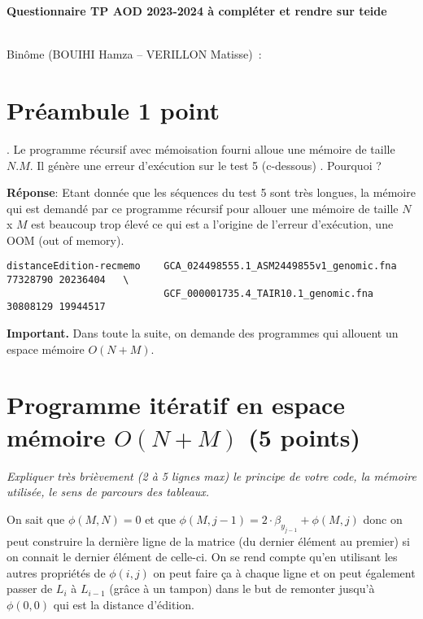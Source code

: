 \documentclass[10pt,a4paper]{article}
\begin{document}
\thispagestyle{empty}

\noindent\centerline{\bf\large Questionnaire  TP AOD 2023-2024 à compléter et rendre sur teide  } \\
Binôme 
(BOUIHI Hamza --
 VERILLON Matisse)
\,: \dotfill

\section{Préambule 1 point}.
Le programme récursif avec mémoisation fourni alloue une mémoire de taille $N.M$.
Il génère une erreur d'exécution sur le test 5 (c-dessous) . Pourquoi ? 

\vspace{0.2cm}
\textbf{Réponse}:  Etant donnée que les séquences du test 5 sont très longues, la mémoire qui est demandé par ce programme récursif pour allouer une mémoire de taille $N$ x $M$ est beaucoup trop élevé ce qui est a l'origine de l'erreur d'exécution, une OOM (out of memory).
\begin{verbatim}
distanceEdition-recmemo    GCA_024498555.1_ASM2449855v1_genomic.fna 77328790 20236404   \
                           GCF_000001735.4_TAIR10.1_genomic.fna 30808129 19944517 
\end{verbatim}

{\noindent\bf{Important}.} Dans toute la suite, on demande des programmes qui allouent un espace mémoire $O(N+M)$.

\section{Programme itératif en espace mémoire $O(N+M)$ (5 points)}
{\em Expliquer très brièvement (2 à 5 lignes max) le principe de votre code, la mémoire utilisée, le sens de parcours des tableaux.}

\vspace{0.2cm}
On sait que $\phi(M,N) = 0$ et que $\phi(M,j-1) = 2\cdot \beta_{y_{j-1}} + \phi(M,j)$ donc on peut construire la dernière ligne de la matrice (du dernier élément au premier) si on connait le dernier élément de celle-ci. On se rend compte qu'en utilisant les autres propriétés de 
$\phi(i,j)$ on peut faire ça à chaque ligne et on peut également passer de $L_i$ à $L_{i-1}$ (grâce à un tampon) dans le but de remonter jusqu'à $\phi(0,0)$ qui est la distance d'édition.
\vspace*{1.0cm}
\end{document}
